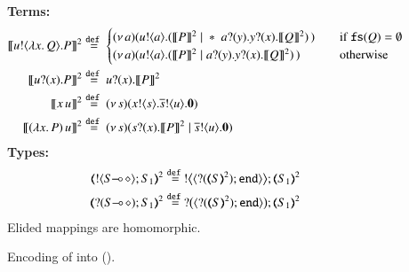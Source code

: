 
\begin{figure}[t]
{\bf Terms:} 
\begin{align*}
	\pmap{\bout{u}{\abs{x}{Q}} P}{2} & \defeq  
	\begin{cases}
		\newsp{a}{\bout{u}{a} (\pmap{P}{2} \Par \repl{\binp{a}{y} \binp{y}{x} \pmap{Q}{2}})\,}\quad
		& \text{if $\fs{Q} = \emptyset$}
		\\
		\newsp{a}{\bout{u}{a} (\pmap{P}{2} \Par \binp{a}{y} \binp{y}{x} \pmap{Q}{2})\,}\quad
		& \text{otherwise} %
	\end{cases}
	\\
	\pmap{\binp{u}{x} P}{2} &\defeq  \binp{u}{x} \pmap{P}{2}
	 \\
	\pmap{\appl{x}{u}}{2} &\defeq \newsp{s}{\bout{x}{s} \bout{\dual{s}}{u} \inact}
	\\
	\pmap{\appl{(\abs{x}{P})}{u}}{2} & \defeq  %
	\newsp{s}{\binp{s}{x} \pmap{P}{2} \Par \bout{\dual{s}}{u} \inact}
\end{align*}
{\bf Types:}
\begin{align*}
		\tmap{\btout{\lhot{S}}S_1}{2} & \defeq \bbtout{\chtype{\btinp{\tmap{S}{2}}\tinact}}\tmap{S_1}{2}
		\\
		\tmap{\btinp{\lhot{S}}S_1}{2} & \defeq \bbtinp{\chtype{\btinp{\tmap{S}{2}}\tinact}}\tmap{S_1}{2}
\end{align*}
Elided mappings are homomorphic.
\caption{Encoding of \HOp into \sessp (). \label{f:enc:ho_to_sessp}}
\end{figure}

